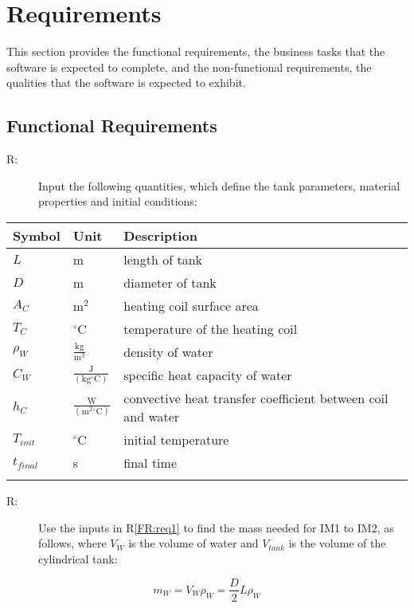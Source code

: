 \documentclass[12pt]{article}
\newcounter{reqnum}
\newcommand{\rthereqnum}{R\thereqnum}
\begin{document}
\section{Requirements}
\label{Sec:Requirements}
This section provides the functional requirements, the business tasks that the software is expected to complete, and the non-functional requirements, the qualities that the software is expected to exhibit.
\subsection{Functional Requirements}
\label{Sec:FRs}
\begin{description}
\item[\rthereqnum\label{FR:req1}:]Input the following quantities, which define the tank parameters, material properties and initial conditions:
\end{description}
\begin{longtabu}{l l X[l]}
\toprule
Symbol & Unit & Description
\\
\midrule
$L$ & m & length of tank
\\
$D$ & m & diameter of tank
\\
${A_{C}}$ & $\text{m}^{2}$ & heating coil surface area
\\
${T_{C}}$ & ${}^{\circ}$C & temperature of the heating coil
\\
${ρ_{W}}$ & $\frac{\text{kg}}{\text{m}^{3}}$ & density of water
\\
${C_{W}}$ & $\frac{\text{J}}{(\text{kg}{}^{\circ}\text{C})}$ & specific heat capacity of water
\\
${h_{C}}$ & $\frac{\text{W}}{(\text{m}^{2}{}^{\circ}\text{C})}$ & convective heat transfer coefficient between coil and water
\\
${T_{init}}$ & ${}^{\circ}$C & initial temperature
\\
${t_{final}}$ & s & final time
\\
\bottomrule
\label{Table:fr1list}
\end{longtabu}
\begin{description}
\item[\rthereqnum\label{FR:req2}:]Use the inputs in R\ref{FR:req1} to find the mass needed for IM1 to IM2, as follows, where ${V_{W}}$ is the volume of water and ${V_{tank}}$ is the volume of the cylindrical tank:
\end{description}
\begin{dmath}
{m_{W}}={V_{W}} {ρ_{W}}=\frac{D}{2} L {ρ_{W}}
\end{dmath}
\end{document}
